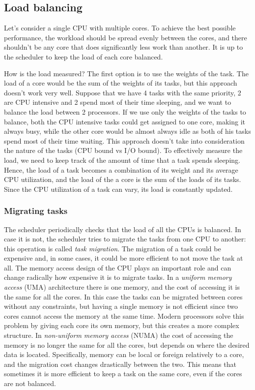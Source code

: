 \subsection{Load balancing}

Let's consider a single CPU with multiple cores. To achieve the best possible performance, the workload should be spread evenly between the cores, and there shouldn't be any core that does significantly less work than another. It is up to the scheduler to keep the load of each core balanced.

How is the load measured? The first option is to use the weights of the task. The load of a core would be the sum of the weights of its tasks, but this approach doesn't work very well. Suppose that we have 4 tasks with the same priority, 2 are CPU intensive and 2 spend most of their time sleeping, and we want to balance the load between 2 processors. If we use only the weights of the tasks to balance, both the CPU intensive tasks could get assigned to one core, making it always busy, while the other core would be almost always idle as both of his tasks spend most of their time waiting. This approach doesn't take into consideration the nature of the tasks (CPU bound vs I/O bound). To effectively measure the load, we need to keep track of the amount of time that a task spends sleeping. Hence, the load of a task becomes a combination of its weight and its average CPU utilization, and the load of the a core is the sum of the loads of its tasks. Since the CPU utilization of a task can vary, its load is constantly updated.

\subsubsection{Migrating tasks}
The scheduler periodically checks that the load of all the CPUs is balanced. In case it is not, the scheduler tries to migrate the tasks from one CPU to another: this operation is called \textit{task migration}. The migration of a task could be expensive and, in some cases, it could be more efficient to not move the task at all. The memory access design of the CPU plays an important role and can change radically how expensive it is to migrate tasks. In a \textit{uniform memory access} (UMA) architecture there is one memory, and the cost of accessing it is the same for all the cores. In this case the tasks can be migrated between cores without any constraints, but having a single memory is not efficient since two cores cannot access the memory at the same time. Modern processors solve this problem by giving each core its own memory, but this creates a more complex structure. In \textit{non-uniform memory access} (NUMA) the cost of accessing the memory is no longer the same for all the cores, but depends on where the desired data is located. Specifically, memory can be local or foreign relatively to a core, and the migration cost changes drastically between the two. This means that sometimes it is more efficient to keep a task on the same core, even if the cores are not balanced. 

